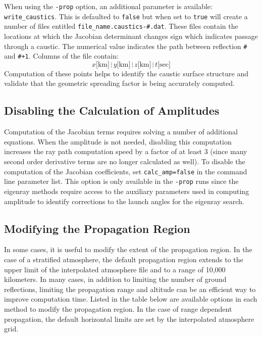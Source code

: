 \documentclass[10pt]{article}
\begin{document}
\hspace{0.25in} When using the \verb=-prop= option, an additional parameter is available: \verb=write_caustics=.  This is defaulted to \verb=false= but when set to \verb=true= will create a number of files entitled \verb=file_name.caustics-#.dat=.  These files contain the locations at which the Jacobian determinant changes sign which indicates passage through a caustic.  The numerical value indicates the path between reflection \verb=#= and \verb=#+1=.  Columns of the file contain:
\begin{equation*}
 x \text{[km]} \hspace{2pt} \vdots \hspace{2pt} 
 y \text{[km]} \hspace{2pt} \vdots \hspace{2pt}  
 z\text{[km]} \hspace{2pt} \vdots \hspace{2pt} 
 t \text{[sec]}
\end{equation*}
Computation of these points helps to identify the caustic surface structure and validate that the geometric spreading factor is being accurately computed.	

\subsection{Disabling the Calculation of Amplitudes}
\label{Sect:AdditionalParams:calc_anp}

\hspace*{0.25in}Computation of the Jacobian terms requires solving a number of additional equations.  When the amplitude is not needed, disabling this computation increases the ray path computation speed by a factor of at least 3 (since many second order derivative terms are no longer calculated as well).  To disable the computation of the Jacobian coefficients,  set \verb#calc_amp=false# in the command line parameter list.  This option is only available in the \verb=-prop= runs since the eigenray methods require access to the auxiliary parameters used in computing amplitude to identify corrections to the launch angles for the eigenray search.

\subsection{Modifying the Propagation Region}
\label{Sect:AdditionalParams:region_bnds}

\hspace*{0.25in}In some cases, it is useful to modify the extent of the propagation region.  In the case of a stratified atmosphere, the default propagation region extends to the upper limit of the interpolated atmosphere file and to a range of 10,000 kilometers.  In many cases, in addition to limiting the number of ground reflections, limiting the propagation range and altitude can be an efficient way to improve computation time.  Listed in the table below are available options in each method to modify the propagation region.  In the case of range dependent propagation, the default horizontal limits are set by the interpolated atmosphere grid.
\end{document}
